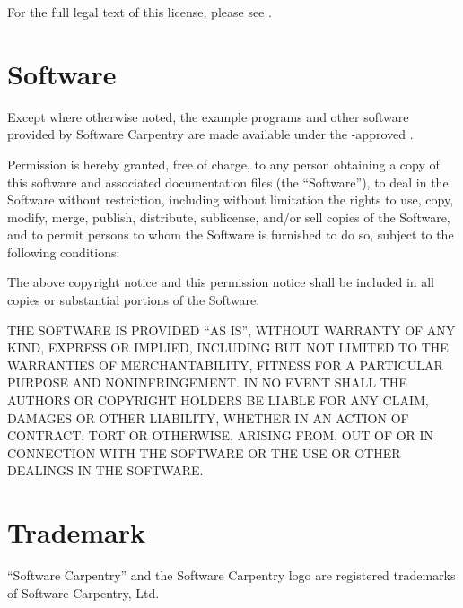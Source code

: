 \documentclass{book}
\begin{document}
For the full legal text of this license, please see
.

\section{Software}

Except where otherwise noted, the example programs and other software
provided by Software Carpentry are made available under the
-approved
.

Permission is hereby granted, free of charge, to any person obtaining a
copy of this software and associated documentation files (the
``Software''), to deal in the Software without restriction, including
without limitation the rights to use, copy, modify, merge, publish,
distribute, sublicense, and/or sell copies of the Software, and to
permit persons to whom the Software is furnished to do so, subject to
the following conditions:

The above copyright notice and this permission notice shall be included
in all copies or substantial portions of the Software.

THE SOFTWARE IS PROVIDED ``AS IS'', WITHOUT WARRANTY OF ANY KIND,
EXPRESS OR IMPLIED, INCLUDING BUT NOT LIMITED TO THE WARRANTIES OF
MERCHANTABILITY, FITNESS FOR A PARTICULAR PURPOSE AND NONINFRINGEMENT.
IN NO EVENT SHALL THE AUTHORS OR COPYRIGHT HOLDERS BE LIABLE FOR ANY
CLAIM, DAMAGES OR OTHER LIABILITY, WHETHER IN AN ACTION OF CONTRACT,
TORT OR OTHERWISE, ARISING FROM, OUT OF OR IN CONNECTION WITH THE
SOFTWARE OR THE USE OR OTHER DEALINGS IN THE SOFTWARE.

\section{Trademark}

``Software Carpentry'' and the Software Carpentry logo are registered
trademarks of Software Carpentry, Ltd.
\end{document}
